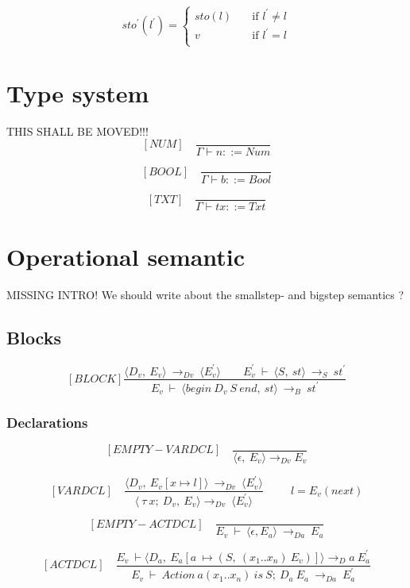   \[ sto^{'}(l^{'}) =
    \begin{cases}
      sto(l)       & \quad \text{if } l^{'} \not= l\\
      v  & \quad \text{if } l^{'} = l\\
    \end{cases}
  \]
  
  
  
  
  \section{Type system}
  THIS SHALL BE MOVED!!!
	\[
	[NUM] \quad
	\dfrac{}{\Gamma \vdash n ::= Num}
	\]
	 
	\[
	[BOOL] \quad
	\dfrac{}{\Gamma \vdash b ::= Bool}
	\]
	
  	\[
  	[TXT] \quad
  	\dfrac{}{\Gamma \vdash tx ::= Txt}
  	\]
  	
  \section{Operational semantic}
  MISSING INTRO! We should write about the smallstep- and bigstep semantics ?
  
  \subsection{Blocks}
    \[
	  [BLOCK]
	  \dfrac{\langle D_v, \ E_v \rangle \ \rightarrow_{Dv} \ \langle E_v^{'} \rangle \qquad E_v^{'} \ \vdash \ \langle S, \ st \rangle \ \rightarrow_S \ st^{'}}{E_v \ \vdash \ \langle begin \ D_v \ S \ end, \ st \rangle \ \rightarrow_B \ st^{'}}
	  \]
  
  \subsubsection{Declarations}
  	\[
	[EMPTY-VARDCL] \quad
	\dfrac{}{\langle\epsilon, \ E_v\rangle \rightarrow_{Dv} E_v}
	\]
    	
   	\[
   	[VARDCL] \quad
   	\dfrac{ \langle D_v, \ E_v[x \mapsto l]\rangle \ \rightarrow_{Dv} \ \langle E_v^{'} \rangle }{ \langle \ \tau \ x; \ D_v,\ E_v \rangle \rightarrow_{Dv} \ \langle E_v^{'} \rangle }
   	\qquad \ \ l = E_v(next)
   	\]
    	
   	\[
   	[EMPTY-ACTDCL] \quad
   	\dfrac{}{E_v \ \vdash \ \langle \epsilon, E_a \rangle \ \rightarrow_{Da} \ E_a}
   	\]
    	
    	
  	\[
   	[ACTDCL] \quad
   	\dfrac{E_v \ \vdash \langle D_a, \ E_a[a \ \mapsto (S, \ (x_1 .. x_n) \ E_v)] \rangle \rightarrow_Da \ E_a^{'}}{E_v \ \vdash \ Action \ a(x_1 .. x_n) \ is \ S; \ D_a \ E_a \ \rightarrow_{Da} \ E_a^{'}}
   	\]
    	
